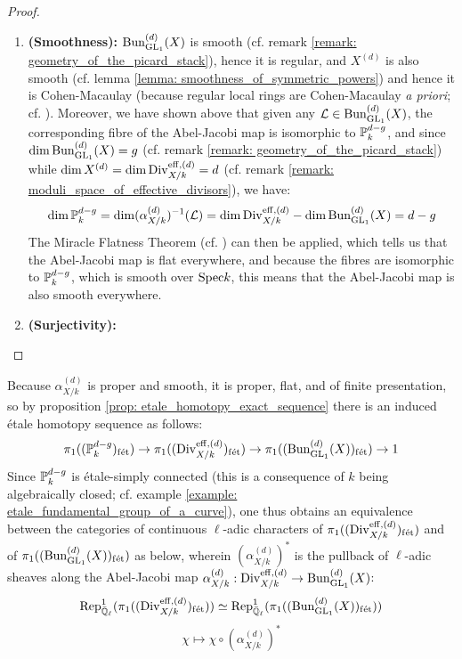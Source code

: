 \begin{proof}
\begin{enumerate}
                        \item \textbf{(Smoothness):} $\Bun_{\GL_1}^{(d)}(X)$ is smooth (cf. remark \ref{remark: geometry_of_the_picard_stack}), hence it is regular, and $X^{(d)}$ is also smooth (cf. lemma \ref{lemma: smoothness_of_symmetric_powers}) and hence it is Cohen-Macaulay (because regular local rings are Cohen-Macaulay \textit{a priori}; cf. \cite[\href{https://stacks.math.columbia.edu/tag/00NQ}{Tag 00NQ}]{stacks}). Moreover, we have shown above that given any $\calL \in \Bun_{\GL_1}^{(d)}(X)$, the corresponding fibre of the Abel-Jacobi map is isomorphic to $\P^{d - g}_k$, and since $\dim \Bun_{\GL_1}^{(d)}(X) = g$ (cf. remark \ref{remark: geometry_of_the_picard_stack}) while $\dim X^{(d)} = \dim \Div_{X/k}^{\eff, (d)} = d$ (cf. remark \ref{remark: moduli_space_of_effective_divisors}), we have:
                            $$\dim \P^{d - g}_k = \dim (\alpha_{X/k}^{(d)})^{-1}(\calL) = \dim \Div_{X/k}^{\eff, (d)} - \dim \Bun_{\GL_1}^{(d)}(X) = d - g$$
                        The Miracle Flatness Theorem (cf. \cite[\href{https://stacks.math.columbia.edu/tag/00R4}{Tag 00R4}]{stacks}) can then be applied, which tells us that the Abel-Jacobi map is flat everywhere, and because the fibres are isomorphic to $\P^{d - g}_k$, which is smooth over $\Spec k$, this means that the Abel-Jacobi map is also smooth everywhere.
                        \item \textbf{(Surjectivity):}
                    \end{enumerate}
            \end{proof}
        \begin{corollary} \label{coro: unramified_galois_representations_induced_by_the_abel_jacobi_map}
            Because $\alpha_{X/k}^{(d)}$ is proper and smooth, it is proper, flat, and of finite presentation, so by proposition \ref{prop: etale_homotopy_exact_sequence} there is an induced \'etale homotopy sequence as follows:
                $$\pi_1((\P^{d - g}_k)_{\fet}) \to \pi_1((\Div_{X/k}^{\eff, (d)})_{\fet}) \to \pi_1((\Bun_{\GL_1}^{(d)}(X))_{\fet}) \to 1$$
            Since $\P^{d - g}_k$ is \'etale-simply connected (this is a consequence of $k$ being algebraically closed; cf. example \ref{example: etale_fundamental_group_of_a_curve}), one thus obtains an equivalence between the categories of continuous $\ell$-adic characters of $\pi_1((\Div_{X/k}^{\eff, (d)})_{\fet})$ and of $\pi_1((\Bun_{\GL_1}^{(d)}(X))_{\fet})$ as below, wherein $(\alpha_{X/k}^{(d)})^*$ is the pullback of $\ell$-adic sheaves along the Abel-Jacobi map $\alpha_{X/k}^{(d)}: \Div_{X/k}^{\eff, (d)} \to \Bun_{\GL_1}^{(d)}(X)$:
                $$\Rep^1_{\bar{\Q}_{\ell}}(\pi_1((\Div_{X/k}^{\eff, (d)})_{\fet})) \cong \Rep^1_{\bar{\Q}_{\ell}}(\pi_1((\Bun_{\GL_1}^{(d)}(X))_{\fet}))$$
                $$\chi \mapsto \chi \circ (\alpha_{X/k}^{(d)})^*$$
        \end{corollary}
